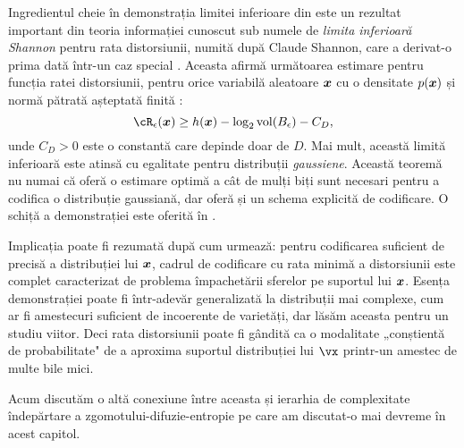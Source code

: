 \documentclass[../../book-main_ro.tex]{subfiles}
\begin{document}
\begin{remark}\label{rem:slb}
	Ingredientul cheie în demonstrația limitei inferioare din
	 este un rezultat important din
	teoria informației cunoscut sub numele de \textit{limita inferioară Shannon} pentru rata
	distorsiunii, numită după Claude Shannon, care a derivat-o prima dată într-un caz special
	\cite{shannon1959coding}. Aceasta
	afirmă următoarea estimare pentru funcția ratei distorsiunii, pentru orice variabilă
	aleatoare $\bm{x}$ cu
	o densitate $p(\bm{x})$ și normă pătrată așteptată finită \cite{Linder1994-ej}:
	\begin{equation}\label{eq:slb}
		\cR_{\epsilon}(\x)
		\geq
		h(\x)
		- \log_2 \volume(B_{\epsilon})
		-
		C_D,
	\end{equation}
	unde $C_D > 0$ este o constantă care depinde doar de $D$. Mai mult, această limită inferioară
	este atinsă cu egalitate pentru distribuții \textit{gaussiene}. Această teoremă nu numai
	că oferă o estimare optimă a cât de mulți biți sunt necesari pentru a codifica o
	distribuție gaussiană, dar oferă și un schema explicită de codificare.
	O schiță a demonstrației este oferită în .
\end{remark}

Implicația  poate fi rezumată după cum urmează: pentru codificarea suficient de precisă a distribuției lui $\bm{x}$, cadrul de codificare cu rata minimă a distorsiunii este complet caracterizat de problema împachetării sferelor pe suportul lui $\bm{x}$.
Esența demonstrației  poate fi într-adevăr generalizată la distribuții mai complexe, cum ar fi amestecuri suficient de incoerente de varietăți, dar lăsăm aceasta pentru un studiu viitor.
Deci rata distorsiunii poate fi gândită ca o modalitate „conștientă de probabilitate" de a aproxima suportul distribuției lui \(\vx\) printr-un amestec de multe bile mici.

Acum discutăm o altă conexiune între aceasta și ierarhia de complexitate îndepărtare a zgomotului-difuzie-entropie pe care am discutat-o mai devreme în acest capitol.
\end{document}
